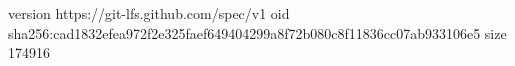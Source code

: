 version https://git-lfs.github.com/spec/v1
oid sha256:cad1832efea972f2e325faef649404299a8f72b080c8f11836cc07ab933106e5
size 174916
